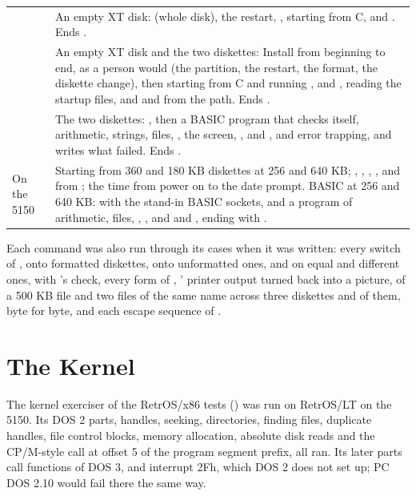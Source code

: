 \begin{tabularx}{\textwidth}{@{}P{1.55in}Y@{}}
\toprule
{} & An empty XT disk:  (whole disk),
the restart, , starting from C, and .
Ends .\\
 & An empty XT disk and the two diskettes:
Install from beginning to end, as a person would (the partition, the
restart, the format, the diskette change), then starting from C and
running ,  and , reading the
startup files, and  and  from the path.
Ends .\\
 & The two diskettes: , then
a BASIC program that checks itself, arithmetic, strings, files,
, the screen, ,  and , and
error trapping, and writes what failed. Ends .\\
On the 5150 & Starting from 360 and 180 KB diskettes at 256 and 640 KB;
, , , ,
 and  from ; the time from
power on to the date prompt. BASIC at 256 and 640 KB: 
with the stand-in BASIC sockets, and a program of arithmetic, files,
, ,  and  and
, ending with .\\
\bottomrule
\end{tabularx}

Each command was also run through its cases when it was written: every
switch of ,  onto formatted diskettes,
 onto unformatted ones,  and 
on equal and different ones,  with 's check,
every form of , ' printer output turned back
into a picture,  of a 500 KB file and two files of the same
name across three diskettes and  of them, byte for byte,
and each escape sequence of .

\section{The Kernel}

The kernel exerciser of the RetrOS/x86 tests () was run
on RetrOS/LT on the 5150. Its DOS 2 parts, handles, seeking,
directories, finding files, duplicate handles, file control blocks, memory
allocation, absolute disk reads and the CP/M-style call at offset 5 of the
program segment prefix, all ran. Its later parts call functions of DOS 3,
and interrupt 2Fh, which DOS 2 does not set up; PC DOS 2.10 would fail
there the same way.

